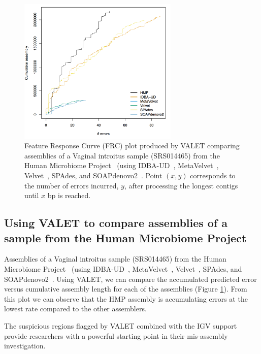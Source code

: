\documentclass{bioinfo}
\begin{document}
\begin{figure}
\begin{center}
\includegraphics[width=3in]{figures/frc.png}
\end{center}
\caption[hmp_frc]{Feature Response Curve (FRC) plot produced by VALET comparing assemblies of a Vaginal introitus sample (SRS014465) from the Human Microbiome Project~\citep{human2012structure} (using IDBA-UD~\citep{peng2012idba}, MetaVelvet~\citep{namiki2012metavelvet}, Velvet~\citep{zerbino2008velvet}, SPAdes\citep{bankevich2012spades}, and SOAPdenovo2~\citep{luo2012soapdenovo2}. Point $(x,y)$ corresponds to the number of errors incurred, $y$, after processing the longest contigs until $x$ bp is reached.}
\label{fig:hmp_frc}
\end{figure}

\subsection{Using VALET to compare assemblies of a sample from the Human Microbiome Project}

Assemblies of a Vaginal introitus sample (SRS014465) from the Human Microbiome Project~\citep{human2012structure} (using IDBA-UD~\citep{peng2012idba}, MetaVelvet~\citep{namiki2012metavelvet}, Velvet~\citep{zerbino2008velvet}, SPAdes\citep{bankevich2012spades}, and SOAPdenovo2~\citep{luo2012soapdenovo2}.
Using VALET, we can compare the accumulated predicted error versus cumulative assembly length for each of the assemblies (Figure \ref{fig:hmp_frc}).
From this plot we can observe that the HMP assembly is accumulating errors at the lowest rate compared to the other assemblers.

The suspicious regions flagged by VALET combined with the IGV support provide researchers with a powerful starting point in their mis-assembly investigation.
\end{document}
